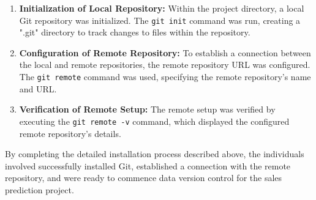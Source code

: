 \begin{enumerate}[label=\textbf{\arabic*.}]
		\item \textbf{Initialization of Local Repository:} Within the project directory, a local Git repository was initialized. The \texttt{git init} command was run, creating a ".git" directory to track changes to files within the repository.
		
		\item \textbf{Configuration of Remote Repository:} To establish a connection between the local and remote repositories, the remote repository URL was configured. The \texttt{git remote} command was used, specifying the remote repository's name and URL.
		
		\item \textbf{Verification of Remote Setup:} The remote setup was verified by executing the \texttt{git remote -v} command, which displayed the configured remote repository's details.
	\end{enumerate}
	
	By completing the detailed installation process described above, the individuals involved successfully installed Git, established a connection with the remote repository, and were ready to commence data version control for the sales prediction project.
	


	


	


	

	

	








	
